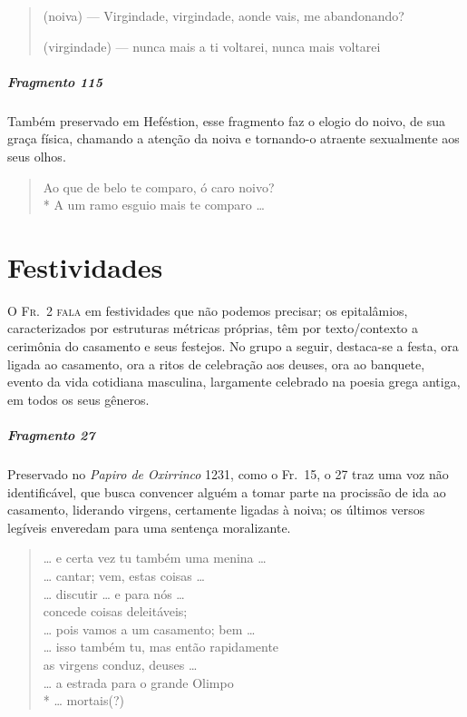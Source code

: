 {\begin{verse}
(noiva) --- Virgindade, virgindade, aonde vais, me \qb{}abandonando?

(virgindade) --- nunca mais a ti voltarei, nunca mais \qb{}voltarei
\end{verse}

\paragraph{Fragmento 115}

{\small Também preservado em Heféstion, esse fragmento faz o elogio do noivo, de sua
graça física, chamando a atenção da noiva e tornando-o atraente sexualmente aos
seus olhos. }

\begin{verse}
Ao que de belo te comparo, ó caro noivo?\\*
A um ramo esguio mais te comparo \ldots{}
\end{verse}


\chapter{Festividades}

\textsc{O Fr.~2 fala} em festividades que não podemos precisar; os epitalâmios,
caracterizados por estruturas métricas próprias, têm por texto/contexto a
cerimônia do casamento e seus festejos. No grupo a seguir, destaca-se a festa,
ora ligada ao casamento, ora a ritos de celebração aos deuses, ora ao banquete,
evento da vida cotidiana masculina, largamente celebrado na poesia grega
antiga, em todos os seus gêneros.

\paragraph{Fragmento 27}

{\small Preservado no \textit{Papiro de Oxirrinco} 1231, como o Fr.~15, o 27 traz uma
voz não identificável, que busca convencer alguém a tomar parte na procissão de
ida ao casamento, liderando virgens, certamente ligadas à noiva; os últimos versos
legíveis enveredam para uma sentença moralizante.}

\begin{verse}
\ldots{} e certa vez tu também uma menina \ldots{}\\
\ldots{} cantar; vem, estas coisas \ldots{}\\
\ldots{} discutir \ldots{} e para nós \ldots{}\\
concede coisas deleitáveis;\\
\ldots{} pois vamos a um casamento; bem \ldots{}\\
\ldots{} isso também tu, mas então rapidamente\\
as virgens conduz, deuses \ldots{}\\
\ldots{} a estrada para o grande Olimpo\\*
\ldots{} mortais(?)
\end{verse}

}
